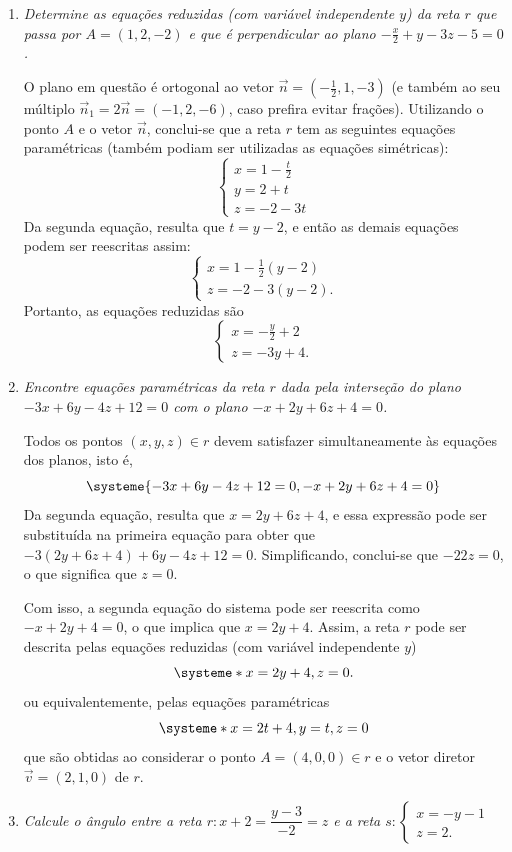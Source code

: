 \documentclass[12pt,a4paper]{article}
\begin{document}
\begin{enumerate}
\item \textit{ Determine as equações reduzidas (com variável independente $y$) da reta $r$ que passa por $A = (1,2,-2)$ e que é perpendicular ao plano $-\frac{x}{2} + y - 3z - 5 = 0$.}

O plano em questão é ortogonal ao vetor $\vec{n} = (-\frac{1}{2}, 1, -3)$ (e também ao seu múltiplo $\vec{n}_1 = 2 \vec{n} = (-1, 2, -6)$, caso prefira evitar frações). Utilizando o ponto $A$ e o vetor $\vec{n}$, conclui-se que a reta $r$ tem as seguintes equações paramétricas (também podiam ser utilizadas as equações simétricas):
\[
\begin{cases}
x = 1 - \frac{t}{2}\\
y = 2 + t\\
z = -2 - 3t
\end{cases}
\]
Da segunda equação, resulta que $t = y - 2$, e então as demais equações podem ser reescritas assim:
\[
\begin{cases}
x = 1 - \frac{1}{2}(y - 2)\\
z = -2 - 3(y - 2).
\end{cases}
\]
Portanto, as equações reduzidas são
\[
\begin{cases}
x = -\frac{y}{2} +2 \\
z = - 3y + 4.
\end{cases}
\]

\item \textit{ Encontre equações paramétricas da reta $r$ dada pela interseção do plano $-3x + 6y - 4z + 12 = 0$ com o plano $-x + 2y + 6z + 4 = 0$. }

Todos os pontos $(x, y, z) \in r$ devem satisfazer simultaneamente às equações dos planos, isto é,
\[
\systeme{
-3x + 6y - 4z + 12 = 0,
 -x + 2y + 6z +  4 = 0}
\]
Da segunda equação, resulta que $x = 2y + 6z +  4$, e essa expressão pode ser substituída na primeira equação para obter que $-3(2y +  6z +  4) + 6y - 4z + 12 = 0$. Simplificando, conclui-se que $- 22z = 0$, o que significa que $z = 0$.

Com isso, a segunda equação do sistema pode ser reescrita como $-x + 2y + 4 = 0$, o que implica que $x = 2y + 4$. Assim, a reta $r$ pode ser descrita pelas equações reduzidas (com variável independente $y$)
\[
\systeme*{
x = 2y + 4,
z = 0.
}
\]
ou equivalentemente, pelas equações paramétricas
\[
\systeme*{
x = 2t + 4,
y = t,
z = 0
}
\]
que são obtidas ao considerar o ponto $A = (4, 0, 0) \in r$ e o vetor diretor $\vec{v} = (2, 1, 0)$ de $r$.

\item \textit{ Calcule o ângulo entre a reta $r: x+2 = \dfrac{y-3}{-2} = z$ e a reta $s : \begin{cases}
x = -y -1 \\
z = 2.
\end{cases}$ }


\end{enumerate}
\end{document}
